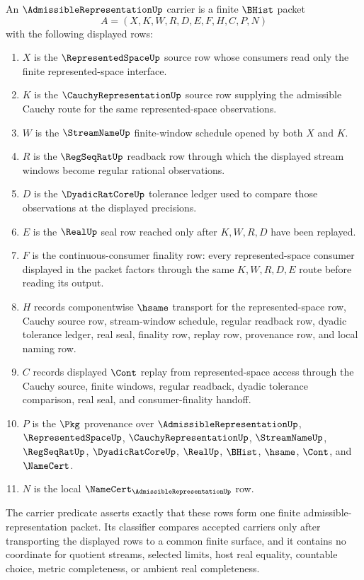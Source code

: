 \begin{definition}
\label{def:admissible-representation-carrier}
An $\AdmissibleRepresentationUp$ carrier is a finite $\BHist$ packet
$$
A=(X,K,W,R,D,E,F,H,C,P,N)
$$
with the following displayed rows:
\begin{enumerate}
\item $X$ is the $\RepresentedSpaceUp$ source row whose consumers read only the finite represented-space interface.
\item $K$ is the $\CauchyRepresentationUp$ source row supplying the admissible Cauchy route for the same represented-space observations.
\item $W$ is the $\StreamNameUp$ finite-window schedule opened by both $X$ and $K$.
\item $R$ is the $\RegSeqRatUp$ readback row through which the displayed stream windows become regular rational observations.
\item $D$ is the $\DyadicRatCoreUp$ tolerance ledger used to compare those observations at the displayed precisions.
\item $E$ is the $\RealUp$ seal row reached only after $K,W,R,D$ have been replayed.
\item $F$ is the continuous-consumer finality row: every represented-space consumer displayed in the packet factors through the same $K,W,R,D,E$ route before reading its output.
\item $H$ records componentwise $\hsame$ transport for the represented-space row, Cauchy source row, stream-window schedule, regular readback row, dyadic tolerance ledger, real seal, finality row, replay row, provenance row, and local naming row.
\item $C$ records displayed $\Cont$ replay from represented-space access through the Cauchy source, finite windows, regular readback, dyadic tolerance comparison, real seal, and consumer-finality handoff.
\item $P$ is the $\Pkg$ provenance over $\AdmissibleRepresentationUp$, $\RepresentedSpaceUp$, $\CauchyRepresentationUp$, $\StreamNameUp$, $\RegSeqRatUp$, $\DyadicRatCoreUp$, $\RealUp$, $\BHist$, $\hsame$, $\Cont$, and $\NameCert$.
\item $N$ is the local $\NameCert_{\AdmissibleRepresentationUp}$ row.
\end{enumerate}
The carrier predicate asserts exactly that these rows form one finite admissible-representation packet. Its classifier compares accepted carriers only after transporting the displayed rows to a common finite surface, and it contains no coordinate for quotient streams, selected limits, host real equality, countable choice, metric completeness, or ambient real completeness.
\end{definition}

